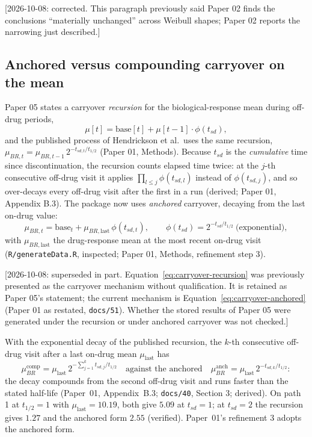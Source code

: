 \documentclass[11pt]{article}
\newcommand{\note}[1]{\textcolor{blue!60!black}{\small [#1]}}
\newcommand{\code}[1]{\texttt{#1}}
\begin{document}
\note{2026-10-08: corrected. This paragraph previously said Paper 02
finds the conclusions ``materially unchanged'' across Weibull shapes;
Paper 02 reports the narrowing just described.}

\subsection{Anchored versus compounding carryover on the mean}
\label{sec:cg-anchor}

Paper 05 states a carryover \emph{recursion} for the
biological-response mean during off-drug periods,
\begin{equation}
\mu[t] = \mathrm{base}[t] + \mu[t-1]\cdot\phi(t_{sd}),
\label{eq:carryover-recursion}
\end{equation}
and the published process of Hendrickson et al.\ uses the same
recursion, $\mu_{BR,t} = \mu_{BR,t-1}\,2^{-t_{sd,t}/t_{1/2}}$ (Paper
01, Methods). Because $t_{sd}$ is the \emph{cumulative} time since
discontinuation, the recursion counts elapsed time twice: at the
$j$-th consecutive off-drug visit it applies
$\prod_{l \le j}\phi(t_{sd,l})$ instead of $\phi(t_{sd,j})$, and so
over-decays every off-drug visit after the first in a run (derived;
Paper 01, Appendix B.3). The package now uses \emph{anchored}
carryover, decaying from the last on-drug value:
\begin{equation}
\mu_{BR,t} = \mathrm{base}_t + \mu_{BR,\mathrm{last}}\,
  \phi(t_{sd,t}), \qquad \phi(t_{sd}) = 2^{-t_{sd}/t_{1/2}}
  \ \text{(exponential)},
\label{eq:carryover-anchored}
\end{equation}
with $\mu_{BR,\mathrm{last}}$ the drug-response mean at the most
recent on-drug visit (\code{R/generateData.R}, inspected; Paper 01,
Methods, refinement step 3).

\note{2026-10-08: superseded in part. Equation~\eqref{eq:carryover-recursion}
was previously presented as the carryover mechanism without
qualification. It is retained as Paper 05's statement; the current
mechanism is Equation~\eqref{eq:carryover-anchored} (Paper 01 as
restated, \code{docs/51}). Whether the stored results of Paper 05 were
generated under the recursion or under anchored carryover was not
checked.}

With the exponential decay of the published recursion, the
$k$-th consecutive off-drug visit after a last on-drug mean
$\mu_{\mathrm{last}}$ has
\begin{equation}
\mu_{BR}^{\mathrm{comp}} = \mu_{\mathrm{last}}\,
  2^{-\sum_{j=1}^{k} t_{sd,j}/t_{1/2}}
\quad\text{against the anchored}\quad
\mu_{BR}^{\mathrm{anch}} = \mu_{\mathrm{last}}\,2^{-t_{sd,k}/t_{1/2}}:
\label{eq:cg-anchor}
\end{equation}
the decay compounds from the second off-drug visit and runs faster
than the stated half-life (Paper~01, Appendix~B.3; \code{docs/40},
Section 3; derived). On path 1 at $t_{1/2} = 1$ with
$\mu_{\mathrm{last}} = 10.19$, both give $5.09$ at $t_{sd} = 1$; at
$t_{sd} = 2$ the recursion gives $1.27$ and the anchored form $2.55$
(verified). Paper~01's refinement 3 adopts the anchored form.
\end{document}
